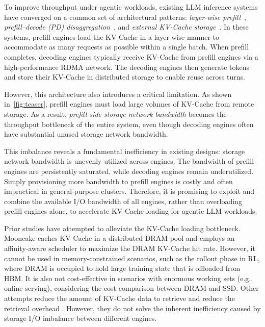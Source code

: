 To improve throughput under agentic workloads, existing LLM inference systems have converged on a common set of architectural patterns: \emph{layer-wise prefill}~\cite{LayerKV,SOSP25:PrefillOnly}, \emph{prefill--decode (PD) disaggregation}~\cite{OSDI24:DistServe,ISCA24:Splitwise,zhao2025insights}, and \emph{external KV-Cache storage}~\cite{ATC24:CachedAttention, LMCache, FAST25:Mooncake}.
In these systems, prefill engines load the KV-Cache in a layer-wise manner to accommodate as many requests as possible within a single batch. When prefill completes, decoding engines typically receive KV-Cache from prefill engines via a high-performance RDMA network. The decoding engines then generate tokens and store their KV-Cache in distributed storage to enable reuse across turns. %

However, this architecture also introduces a critical limitation. As shown in~\autoref{fig:teaser}, prefill engines must load large volumes of KV-Cache from remote storage.
As a result, \emph{prefill-side storage network bandwidth} becomes the throughput bottleneck of the entire system, even though decoding engines often have substantial unused storage network bandwidth.

This imbalance reveals a fundamental inefficiency in existing designs: storage network bandwidth is unevenly utilized across engines. The bandwidth of prefill engines are persistently saturated, while decoding engines remain underutilized. 
Simply provisioning more bandwidth to prefill engines is costly and often impractical in general-purpose clusters. Therefore, it is promising to exploit and combine the available I/O bandwidth of all engines, rather than overloading prefill engines alone, to accelerate KV-Cache loading for agentic LLM workloads.

Prior studies have attempted to alleviate the KV-Cache loading bottleneck.
Mooncake \cite{FAST25:Mooncake} caches KV-Cache in a distributed DRAM pool and employs an affinity-aware scheduler to maximize the DRAM KV-Cache hit rate.
However, it cannot be used in memory-constrained scenarios, such as the rollout phase in RL, where DRAM is occupied to hold large training state that is offloaded from HBM.
It is also not cost-effective in scenarios with enormous working sets (e.g., online serving), considering the cost comparison between DRAM and SSD.
Other attempts reduce the amount of KV-Cache data to retrieve \cite{EuroSys25:HCache} and reduce the retrieval overhead \cite{APSys25:TARDIS, SC25:Phoenix}.
However, they do not solve the inherent inefficiency caused by storage I/O imbalance between different engines.


